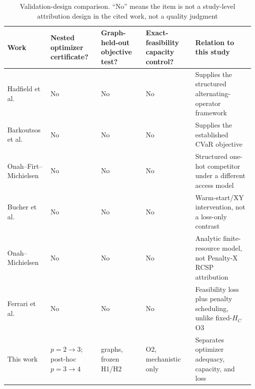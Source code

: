 \begin{table}[p]
\centering
\caption{Validation-design comparison. ``No'' means the item is not a study-level attribution design in the cited work, not a quality judgment}
\label{tab:related-work-validation}
\scriptsize
\setlength{\tabcolsep}{3pt}
\renewcommand{\arraystretch}{1.12}
\begin{tabularx}{\textwidth}{@{}>{\raggedright\arraybackslash}p{2.0cm}>{\raggedright\arraybackslash}p{1.7cm}>{\raggedright\arraybackslash}p{1.5cm}>{\raggedright\arraybackslash}p{1.65cm}X@{}}
\toprule
Work & Nested optimizer certificate? & Graph-held-out objective test? & Exact-feasibility capacity control? & Relation to this study \\
\midrule
Hadfield et al. & No & No & No & Supplies the structured alternating-operator framework \\
Barkoutsos et al. & No & No & No & Supplies the established CVaR objective \\
Onah--Firt--Michielsen & No & No & No & Structured one-hot competitor under a different access model \\
Bucher et al. & No & No & No & Warm-start/XY intervention, not a loss-only contrast \\
Onah--Michielsen & No & No & No & Analytic finite-resource model, not Penalty-X RCSP attribution \\
Ferrari et al. & No & No & No & Feasibility loss plus penalty scheduling, unlike fixed-$H_C$ O3 \\
This work & $p=2\to3$; post-hoc $p=3\to4$ & 15 graphs, frozen H1/H2 & O2, mechanistic only & Separates optimizer adequacy, capacity, and loss \\
\bottomrule
\end{tabularx}
\end{table}

\clearpage
